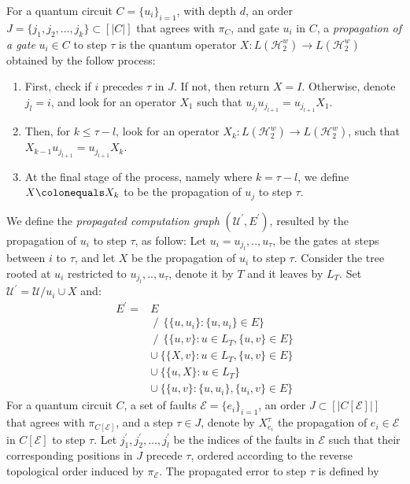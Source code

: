 \begin{definition}
  For a quantum circuit $C=\{u_{i}\}_{i=1}$, with depth $d$, an order $J = \{ j_{1}, j_{2}, \ldots, j_{k} \} \subset [|C|]$ that agrees with $\pi_{C}$, and gate $u_{i}$ in $C$, a \textit{propagation of a gate} $u_{i} \in C$ to step $\tau$ is the quantum operator $X\colon L(\mathcal{H}_{2}^{w}) \rightarrow L(\mathcal{H}_{2}^{w})$ obtained by the follow process: 
  \begin{enumerate}
    \item First, check if $i$ precedes $\tau$ in $J$. If not, then return $X = I$. Otherwise, denote $j_{l} = i$, and look for an operator $X_{1}$ such that $u_{j_{l}}u_{j_{l+1}} = u_{j_{l+1}}X_{1}$.
    \item Then, for $k \le \tau - l$, look for an operator $X_{k} \colon L(\mathcal{H}_{2}^{w}) \rightarrow L(\mathcal{H}_{2}^{w})$, such that  $X_{k-1}u_{j_{l+1}} =  u_{j_{l+1}}X_{k}$.
    \item At the final stage of the process, namely where $k = \tau - l$, we define $X \colonequals X_{k}$ to be the propagation of $u_{j}$ to step $\tau$.
  \end{enumerate}
  We define the \textit{propagated computation graph} $(\mathcal{U}^{\prime},E^{\prime})$, resulted by the propagation of $u_{i}$ to step $\tau$, as follow: Let $u_{i} = u_{j_{l}},..,u_{\tau}$, be the gates at steps between $i$ to $\tau$, and let $X$ be the propagation of $u_{i}$ to step $\tau$. Consider the tree rooted at $u_{i}$ restricted to $u_{j_{l}},..,u_{\tau}$, denote it by $T$ and it leaves by $L_{T}$. Set $\mathcal{U}^{\prime} = \mathcal{U}/u_{i} \cup X $ and:  
  \begin{equation*}
    \begin{split}
      E^{\prime} = & E \\
      &  \ /  \ \ \big\{  \{u, u_{i}\} : \{u,u_{i}\} \in E  \big\} \\
       & \ /  \ \ \big\{  \{u, v\} : u \in L_{T}, \{u,v\} \in E  \big\} \\
       & \cup \ \big\{  \{X, v\} : u \in L_{T}, \{u,v\} \in E  \big\} \\
       & \cup \ \big\{  \{u, X\} : u \in L_{T} \big\} \\
       & \cup \ \big\{  \{u, v\} : \{u,u_{i}\}, \{u_{i},v\} \in E \big\}
    \end{split}
  \end{equation*}
  For a quantum circuit $C$, a set of faults $\mathcal{E} = \{ e_{i} \}_{i=1}$, an order $J \subset [|C[\mathcal{E}]|]$ that agrees with $\pi_{C[\mathcal{E}]}$, and a step $\tau \in J$, denote by $X_{e_{i}}^{\tau}$ the propagation of $e_{i} \in \mathcal{E}$ in $C[\mathcal{E}]$ to step $\tau$. Let $j^{\prime}_{1}, j^{\prime}_{2}, \ldots, j^{\prime}_{l}$ be the indices of the faults in $\mathcal{E}$ such that their corresponding positions in $J$ precede $\tau$, ordered according to the reverse topological order induced by $\pi_{\mathcal{E}}$. The propagated error to step $\tau$ is defined by

\end{definition}
